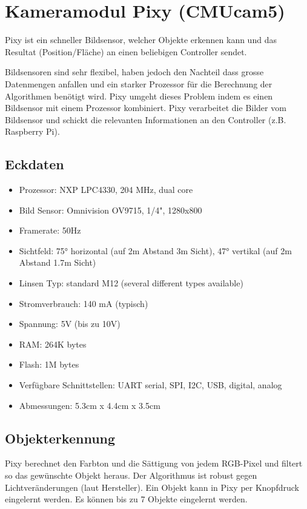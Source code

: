 \section{Kameramodul Pixy (CMUcam5)}

Pixy ist ein schneller Bildsensor, welcher Objekte erkennen kann und das Resultat (Position/Fläche) an einen beliebigen Controller sendet.

Bildsensoren sind sehr flexibel, haben jedoch den Nachteil dass grosse Datenmengen anfallen und ein starker Prozessor für die Berechnung der Algorithmen benötigt wird. Pixy umgeht dieses Problem indem es einen Bildsensor mit einem Prozessor kombiniert. Pixy verarbeitet die Bilder vom Bildsensor und schickt die relevanten Informationen an den Controller (z.B. Raspberry Pi).

\subsection{Eckdaten}

\begin{itemize}
	\item Prozessor: NXP LPC4330, 204 MHz, dual core
	\item Bild Sensor: Omnivision OV9715, 1/4", 1280x800
	\item Framerate: 50Hz
	\item Sichtfeld: 75° horizontal (auf 2m Abstand 3m Sicht), 47° vertikal (auf 2m Abstand 1.7m Sicht)
	\item Linsen Typ: standard M12 (several different types available)
	\item Stromverbrauch: 140 mA (typisch)
	\item Spannung: 5V (bis zu 10V)
	\item RAM: 264K bytes
	\item Flash: 1M bytes
	\item Verfügbare Schnittstellen: UART serial, SPI, I2C, USB, digital, analog
	\item Abmessungen: 5.3cm x 4.4cm x 3.5cm
\end{itemize}

\subsection{Objekterkennung}

Pixy berechnet den Farbton und die Sättigung von jedem RGB-Pixel und filtert so das gewünschte Objekt heraus. Der Algorithmus ist robust gegen Lichtveränderungen (laut Hersteller). Ein Objekt kann in Pixy per Knopfdruck eingelernt werden. Es können bis zu 7 Objekte eingelernt werden.

